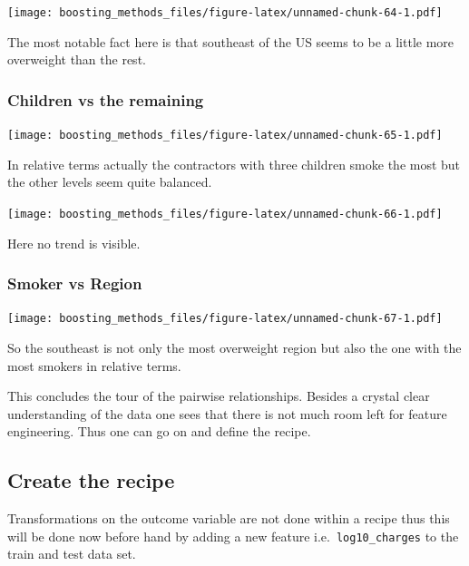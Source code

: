 \documentclass[
]{book}
\newenvironment{Shaded}{\begin{snugshade}}{\end{snugshade}}
\newcommand{\CommentTok}[1]{\textcolor[rgb]{0.56,0.35,0.01}{\textit{#1}}}
\newcommand{\FunctionTok}[1]{\textcolor[rgb]{0.00,0.00,0.00}{#1}}
\newcommand{\NormalTok}[1]{#1}
\newcommand{\OtherTok}[1]{\textcolor[rgb]{0.56,0.35,0.01}{#1}}
\newcommand{\SpecialCharTok}[1]{\textcolor[rgb]{0.00,0.00,0.00}{#1}}
\begin{document}
\texttt{[image: boosting\_methods\_files/figure-latex/unnamed-chunk-64-1.pdf]}

The most notable fact here is that southeast of the US seems to be a little more overweight than the rest.

\hypertarget{children-vs-the-remaining}{%
\subsubsection{Children vs the remaining}\label{children-vs-the-remaining}}

\texttt{[image: boosting\_methods\_files/figure-latex/unnamed-chunk-65-1.pdf]}

In relative terms actually the contractors with three children smoke the most but the other levels seem quite balanced.

\texttt{[image: boosting\_methods\_files/figure-latex/unnamed-chunk-66-1.pdf]}

Here no trend is visible.

\hypertarget{smoker-vs-region}{%
\subsubsection{Smoker vs Region}\label{smoker-vs-region}}

\texttt{[image: boosting\_methods\_files/figure-latex/unnamed-chunk-67-1.pdf]}

So the southeast is not only the most overweight region but also the one with the most smokers in relative terms.

This concludes the tour of the pairwise relationships. Besides a crystal clear understanding of the data one sees that there is not much room left for feature engineering. Thus one can go on and define the recipe.

\hypertarget{create-the-recipe-1}{%
\subsection{Create the recipe}\label{create-the-recipe-1}}

Transformations on the outcome variable are not done within a recipe thus this will be done now before hand by adding a new feature i.e.~\texttt{log10\_charges} to the train and test data set.

\begin{Shaded}
\end{Shaded}
\end{document}
